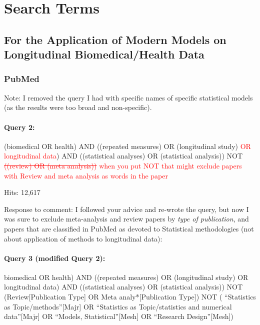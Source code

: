 \documentclass[
]{article}
\let\oldparagraph\paragraph
\renewcommand{\paragraph}[1]{\oldparagraph{#1}\mbox{}}
\newcommand{\BN}[1]{\textcolor{red}{#1}}
\begin{document}
\hypertarget{search-terms}{%
\section{Search Terms}\label{search-terms}}

\hypertarget{for-the-application-of-modern-models-on-longitudinal-biomedicalhealth-data}{%
\subsection{For the Application of Modern Models on Longitudinal
Biomedical/Health
Data}\label{for-the-application-of-modern-models-on-longitudinal-biomedicalhealth-data}}

\hypertarget{pubmed}{%
\subsubsection{PubMed}\label{pubmed}}

Note: I removed the query I had with specific names of specific
statistical models (as the results were too broad and non-specific).

\hypertarget{query-2}{%
\paragraph{Query 2:}\label{query-2}}

(biomedical OR health) AND ((repeated measures) OR (longitudinal study)
\BN{OR longitudinal data}) AND ((statistical analyses) OR (statistical
analysis)) NOT \BN{\sout{((review) OR
(meta analysis))}}
\BN{when you put NOT that might exclude papers with Review and meta analysis as words in the paper}

Hits: 12,617

Response to comment: I followed your advice and re-wrote the query, but
now I was sure to exclude meta-analysis and review papers by \emph{type
of publication}, and papers that are classified in PubMed as devoted to
Statistical methodologies (not about application of methods to
longitudinal data):

\hypertarget{query-3-modified-query-2}{%
\paragraph{Query 3 (modified Query 2):}\label{query-3-modified-query-2}}

biomedical OR health) AND ((repeated measures) OR (longitudinal study)
OR longitudinal data) AND ((statistical analyses) OR (statistical
analysis)) NOT (Review{[}Publication Type{]} OR Meta
analy*{[}Publication Type{]}) NOT ( ``Statistics as
Topic/methods''{[}Majr{]} OR ``Statistics as Topic/statistics and
numerical data''{[}Majr{]} OR ``Models, Statistical''{[}Mesh{]} OR
``Research Design''{[}Mesh{]})
\end{document}
